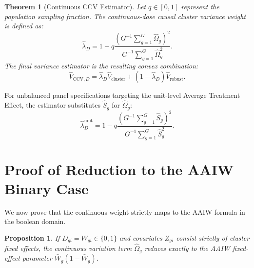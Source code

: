 \documentclass[11pt, letterpaper]{article}
\newtheorem{theorem}{Theorem}
\newtheorem{proposition}{Proposition}
\theoremstyle{remark}
\begin{document}
\begin{theorem}[Continuous CCV Estimator]
Let $q \in [0,1]$ represent the population sampling fraction. The continuous-dose causal cluster variance weight is defined as:
\begin{equation}
    \widehat\lambda_D = 1 - q \frac{\left(G^{-1}\sum_{g=1}^G \widehat\Omega_g\right)^2}{G^{-1}\sum_{g=1}^G \widehat\Omega_g^2}.
\end{equation}
The final variance estimator is the resulting convex combination:
\begin{equation}
    \widehat V_{\text{CCV},D} = \widehat\lambda_D \widehat V_{\text{cluster}} + (1-\widehat\lambda_D)\widehat V_{\text{robust}}.
\end{equation}
\end{theorem}
For unbalanced panel specifications targeting the unit-level Average Treatment Effect, the estimator substitutes $\widehat S_g$ for $\widehat\Omega_g$:
\begin{equation}
    \widehat\lambda_D^{\text{unit}} = 1 - q \frac{\left(G^{-1}\sum_{g=1}^G \widehat S_g\right)^2}{G^{-1}\sum_{g=1}^G \widehat S_g^2}.
\end{equation}

\section{Proof of Reduction to the AAIW Binary Case}

We now prove that the continuous weight strictly maps to the AAIW formula in the boolean domain.

\begin{proposition}
If $D_{gi} = W_{gi} \in \{0,1\}$ and covariates $Z_{gi}$ consist strictly of cluster fixed effects, the continuous variation term $\widehat\Omega_g$ reduces exactly to the AAIW fixed-effect parameter $\bar W_g(1-\bar W_g)$.
\end{proposition}
\end{document}
